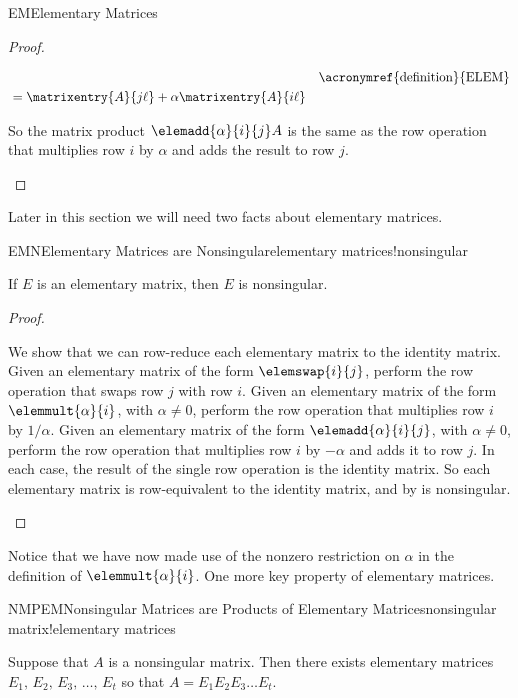 \begin{subsect}{EM}{Elementary Matrices}
\begin{proof}
\begin{para}
\begin{align*}
&&\text{\acronymref{definition}{ELEM}}\\
&=\matrixentry{A}{j\ell}+\alpha\matrixentry{A}{i\ell}
\end{align*}
\end{para}
%
\begin{para}So the matrix product $\elemadd{\alpha}{i}{j}A$ is the same as the row operation that multiplies row $i$ by $\alpha$ and adds the result to row $j$.\end{para}
%
\end{proof}
%
\begin{para}Later in this section we will need two facts about elementary matrices.\end{para}
%
\begin{theorem}{EMN}{Elementary Matrices are Nonsingular}{elementary matrices!nonsingular}
\begin{para}If $E$ is an elementary matrix, then $E$ is nonsingular.\end{para}
\end{theorem}
%
\begin{proof}
\begin{para}We show that we can row-reduce each elementary matrix to the identity matrix.  Given an elementary matrix of the form $\elemswap{i}{j}$, perform the row operation that swaps row $j$ with row $i$.  Given an elementary matrix of the form $\elemmult{\alpha}{i}$, with $\alpha\neq 0$, perform the row operation that multiplies row $i$ by $1/\alpha$.  Given an elementary matrix of the form $\elemadd{\alpha}{i}{j}$, with $\alpha\neq 0$, perform the row operation that multiplies row $i$ by $-\alpha$ and adds it to row $j$.  In each case, the result of the single row operation is the identity matrix.  So each elementary matrix is row-equivalent to the identity matrix, and by  is nonsingular.\end{para}
%
\end{proof}
%
\begin{para}Notice that we have now made use of the nonzero restriction on $\alpha$ in the definition of $\elemmult{\alpha}{i}$.  One more key property of elementary matrices.\end{para}
%
\begin{theorem}{NMPEM}{Nonsingular Matrices are Products of Elementary Matrices}{nonsingular matrix!elementary matrices}
\begin{para}Suppose that $A$ is a nonsingular matrix.  Then there exists elementary matrices $E_1,\,E_2,\,E_3,\,\dots,\,E_t$ so that $A=E_1 E_2 E_3\dots E_t$.\end{para}

\end{theorem}
\end{subsect}
